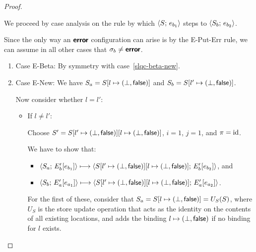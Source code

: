 \begin{proof}
\begin{enumerate}
    We proceed by case analysis on the rule by which
    $\langle S;\, e_{b_1} \rangle$ steps to $\langle S_b;\, e_{b_2} \rangle$.

    Since the only way an $\textbf{\textsf{error}}$ configuration can arise is by the
    {\sc E-Put-Err} rule, we can assume in all other cases that
    $\sigma_b \neq \textbf{\textsf{error}}$.
    \begin{enumerate}
    \item \label{slqc-new-beta}Case {\sc E-Beta}: By symmetry with case~\ref{slqc-beta-new}.
    \item \label{slqc-new-new}Case {\sc E-New}: We have $S_a =
      S[l \mapsto (\bot, \textsf{false})]$ and $S_b =
      S[l' \mapsto (\bot, \textsf{false})]$.

      Now consider whether $l = l'$:
      \begin{itemize}
      \item If $l \neq l'$:

        Choose $S' =
        S[l' \mapsto (\bot, \textsf{false})][l \mapsto (\bot, \textsf{false})]$,
        $i = 1$, $j = 1$, and $\pi = \mathrm{id}$.

        We have to show that:
        \begin{itemize}
        \item $\langle S_a;\, E'_b\hspace{-0.5mm}\left[e_{b_1}\right] \rangle \longmapsto
          \langle S[l' \mapsto (\bot, \textsf{false})][l \mapsto (\bot, \textsf{false})];\, E'_b\hspace{-0.5mm}\left[e_{b_2}\right] \rangle$,
          and
        \item $\langle S_b;\, E'_a\hspace{-0.5mm}\left[e_{a_1}\right] \rangle \longmapsto
          \langle S[l' \mapsto (\bot, \textsf{false})][l \mapsto (\bot, \textsf{false})];\, E'_a\hspace{-0.5mm}\left[e_{a_2}\right] \rangle$.
        \end{itemize}

        For the first of these, consider that $S_a =
        S[l \mapsto (\bot, \textsf{false})] = U_S(S)$, where $U_S$ is
        the store update operation that acts as the identity on the
        contents of all existing locations, and adds the binding
        $l \mapsto (\bot, \textsf{false})$ if no binding for $l$
        exists.


\end{itemize}
\end{enumerate}
\end{enumerate}
\end{proof}
